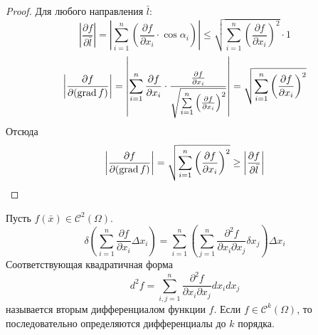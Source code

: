 \begin{proof}
    Для любого направления $\bar{l}$:
    \[\left|\frac{\partial {f}}{\partial {\bar{l}}}\right|=\left|\sum\limits_{i=1}^{n}\left(\frac{\partial {f}}{\partial {x_i}}\cdot \cos{\alpha_i}\right)\right|\leq \sqrt{\sum\limits_{i=1}^{n}\left(\frac{\partial {f}}{\partial {x_i}}\right)^2}\cdot 1\]
    \[\left|\frac{\partial {f}}{\partial {(\operatorname*{grad}{f})}}\right|=\left|\sum\limits_{i=1}^{n}\frac{\partial {f}}{\partial {x_i}}\cdot \frac{\frac{\partial {f}}{\partial {x_i}}}{\sqrt{\sum\limits_{i=1}^{n}\left(\frac{\partial {f}}{\partial {x_i}}\right)^2}}\right|=\sqrt{\sum\limits_{i=1}^{n}\left(\frac{\partial {f}}{\partial {x_i}}\right)^2}\]
    Отсюда
    \[\left|\frac{\partial {f}}{\partial {(\operatorname*{grad}{f})}}\right|=\sqrt{\sum\limits_{i=1}^{n}\left(\frac{\partial {f}}{\partial {x_i}}\right)^2}\geq \left|\frac{\partial {f}}{\partial {\bar{l}}}\right|\]

\end{proof} 
\begin{definition}
    Пусть $f(\bar{x})\in \mathcal{C}^2(\Omega)$.
    \[\delta(\sum\limits_{i=1}^{n}\frac{\partial {f}}{\partial {x_i}}\Delta x_i)=\sum\limits_{i=1}^{n}\left(\sum\limits_{j=1}^{n}\frac{\partial^2 {f}}{\partial {x_i}\partial{x_j}}\delta x_j\right)\Delta x_i\]
    Соответствующая квадратичная форма
    \[d^2f=\sum\limits_{i,j=1}^{n}\frac{\partial^2 {f}}{\partial {x_i}\partial{x_j}} d x_i dx_j\]
    называется вторым дифференциалом функции $f$. Если $f\in \mathcal{C}^k(\Omega)$, то последовательно определяются дифференциалы до $k$ порядка.
\end{definition} 
